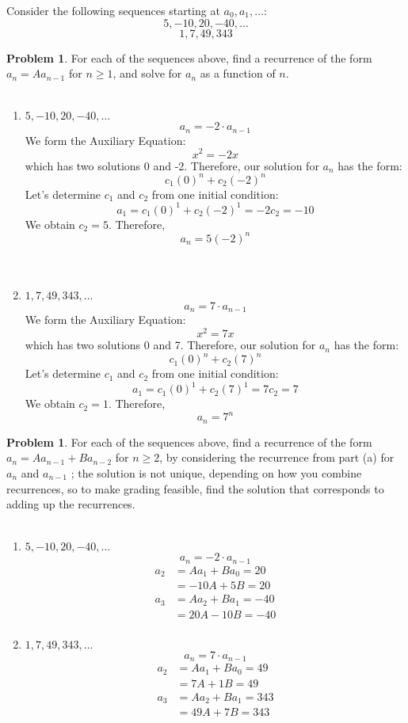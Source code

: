 \documentclass[10pt,leqno ]{article}
\theoremstyle{definition}
\newtheorem{problem}[theorem]{Problem}
\begin{document}
Consider the following sequences starting at $a_0, a_1, \dots$:
$$5, -10, 20, -40, \dots$$
$$ 1, 7, 49, 343$$
\begin{problem} For each of the sequences above, find a recurrence of the form $a_n = Aa_{n-1}$ for $n \geq 1$, and solve for $a_n$ as a function of $n$.
\\\\
\begin{enumerate}[label=\alph*)]
\item $5, -10, 20, -40, \dots$
$$a_n = -2 \cdot a_{n-1}$$
We form the Auxiliary Equation: 
$$x^2 = -2x$$
which has two solutions 0 and -2.   Therefore, our solution for $a_n$ has the form:
$$c_1(0)^n + c_2(-2)^n$$
Let's determine $c_1$ and $c_2$ from one initial condition:
$$a_1 = c_1(0)^1 + c_2(-2)^1 = -2c_2 = -10$$
We obtain $c_2 = 5$.  Therefore,
$$a_n = 5(-2)^n$$
\\\\
\item $1, 7, 49, 343, \dots$
$$a_n = 7 \cdot a_{n-1}$$
We form the Auxiliary Equation: 
$$x^2 = 7x$$
which has two solutions 0 and 7.   Therefore, our solution for $a_n$ has the form:
$$c_1(0)^n + c_2(7)^n$$
Let's determine $c_1$ and $c_2$ from one initial condition:
$$a_1 = c_1(0)^1 + c_2(7)^1 = 7c_2 = 7$$
We obtain $c_2 = 1$.  Therefore,
$$a_n = 7^n$$
\end{enumerate}
\end{problem}
\newpage

\begin{problem} For each of the sequences above, find a recurrence of the form $a_n=Aa_{n-1} + Ba_{n-2}$ for $n \geq 2$, by considering the recurrence from part (a) for $a_n$ and $a_{n-1}$ ; the solution is not unique,  depending on how you combine recurrences,  so to make grading feasible, find the solution that corresponds to adding up the recurrences.
\\\\
\Large

\begin{enumerate}[label=\alph*)]
\item $5, -10, 20, -40, \dots$
$$a_n = -2 \cdot a_{n-1}$$
\begin{align*}
a_2 &= Aa_1 + Ba_0 = 20\\
    &= -10A   + 5B = 20\\
a_3 &= Aa_2 + Ba_1 = -40\\
    &= 20A  -10B   = -40\\
\end{align*}
\item $1, 7, 49, 343, \dots$
$$a_n = 7 \cdot a_{n-1}$$
\begin{align*}
a_2 &= Aa_1 + Ba_0 = 49\\
    &= 7A   + 1B = 49\\
a_3 &= Aa_2 + Ba_1 = 343\\
    &= 49A + 7B   = 343\\
\end{align*}
\end{enumerate}

\end{problem}
\newpage
\end{document}
